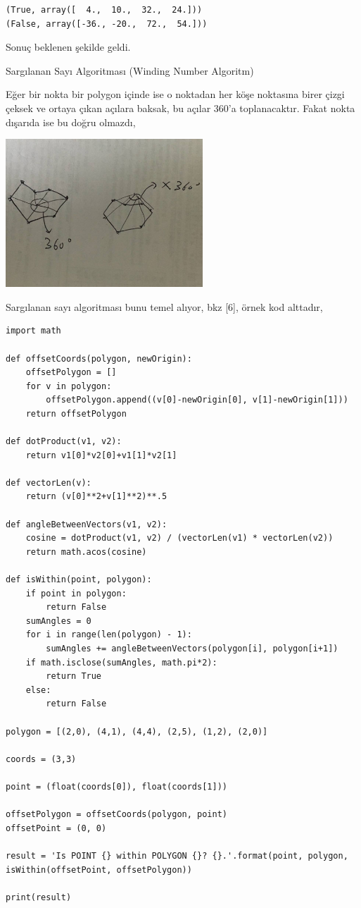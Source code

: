 \documentclass[12pt,fleqn]{article}\usepackage{../../common}
\begin{document}
\begin{verbatim}
(True, array([  4.,  10.,  32.,  24.]))
(False, array([-36., -20.,  72.,  54.]))
\end{verbatim}

Sonuç beklenen şekilde geldi. 

Sargılanan Sayı Algoritması (Winding Number Algoritm)

Eğer bir nokta bir polygon içinde ise o noktadan her köşe noktasına birer
çizgi çeksek ve ortaya çıkan açılara baksak, bu açılar 360'a toplanacaktır.
Fakat nokta dışarıda ise bu doğru olmazdı, 

\includegraphics[width=20em]{winding.jpg}

Sargılanan sayı algoritması bunu temel alıyor, bkz [6], örnek kod alttadır,

\begin{verbatim}
import math

def offsetCoords(polygon, newOrigin):
    offsetPolygon = []
    for v in polygon:
        offsetPolygon.append((v[0]-newOrigin[0], v[1]-newOrigin[1]))
    return offsetPolygon

def dotProduct(v1, v2):
    return v1[0]*v2[0]+v1[1]*v2[1]

def vectorLen(v):
    return (v[0]**2+v[1]**2)**.5

def angleBetweenVectors(v1, v2):
    cosine = dotProduct(v1, v2) / (vectorLen(v1) * vectorLen(v2))
    return math.acos(cosine)

def isWithin(point, polygon):
    if point in polygon:
        return False
    sumAngles = 0
    for i in range(len(polygon) - 1):
        sumAngles += angleBetweenVectors(polygon[i], polygon[i+1])
    if math.isclose(sumAngles, math.pi*2):
        return True
    else:
        return False

polygon = [(2,0), (4,1), (4,4), (2,5), (1,2), (2,0)]

coords = (3,3)

point = (float(coords[0]), float(coords[1]))

offsetPolygon = offsetCoords(polygon, point)
offsetPoint = (0, 0)

result = 'Is POINT {} within POLYGON {}? {}.'.format(point, polygon, isWithin(offsetPoint, offsetPolygon))

print(result) 
\end{verbatim}
\end{document}
